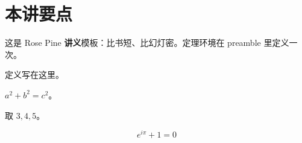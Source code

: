 \section{本讲要点}

这是 Rose Pine \textbf{讲义}模板：比书短、比幻灯密。定理环境在 preamble 里定义一次。

\begin{definition}[样本]
  定义写在这里。
\end{definition}

\begin{theorem}
  $a^2+b^2=c^2$。
\end{theorem}

\begin{example}
  取 $3,4,5$。
\end{example}

\begin{formulabox}
\[
  e^{i\pi}+1=0
\]
\end{formulabox}
